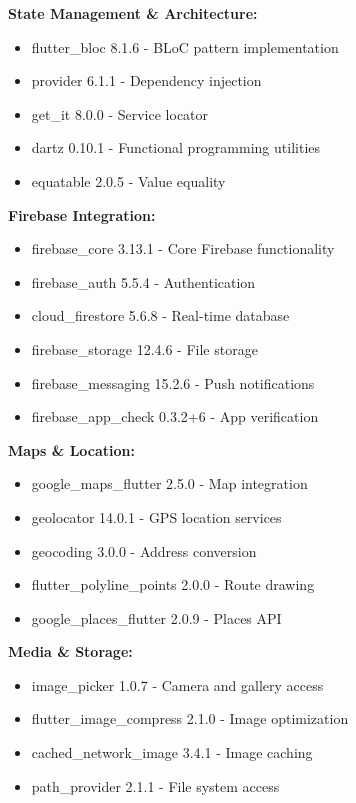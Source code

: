 \documentclass[12pt,a4paper]{article}
\begin{document}
\textbf{State Management \& Architecture:}
\begin{itemize}
    \item flutter\_bloc 8.1.6 - BLoC pattern implementation
    \item provider 6.1.1 - Dependency injection
    \item get\_it 8.0.0 - Service locator
    \item dartz 0.10.1 - Functional programming utilities
    \item equatable 2.0.5 - Value equality
\end{itemize}

\textbf{Firebase Integration:}
\begin{itemize}
    \item firebase\_core 3.13.1 - Core Firebase functionality
    \item firebase\_auth 5.5.4 - Authentication
    \item cloud\_firestore 5.6.8 - Real-time database
    \item firebase\_storage 12.4.6 - File storage
    \item firebase\_messaging 15.2.6 - Push notifications
    \item firebase\_app\_check 0.3.2+6 - App verification
\end{itemize}

\textbf{Maps \& Location:}
\begin{itemize}
    \item google\_maps\_flutter 2.5.0 - Map integration
    \item geolocator 14.0.1 - GPS location services
    \item geocoding 3.0.0 - Address conversion
    \item flutter\_polyline\_points 2.0.0 - Route drawing
    \item google\_places\_flutter 2.0.9 - Places API
\end{itemize}

\textbf{Media \& Storage:}
\begin{itemize}
    \item image\_picker 1.0.7 - Camera and gallery access
    \item flutter\_image\_compress 2.1.0 - Image optimization
    \item cached\_network\_image 3.4.1 - Image caching
    \item path\_provider 2.1.1 - File system access
\end{itemize}
\end{document}
